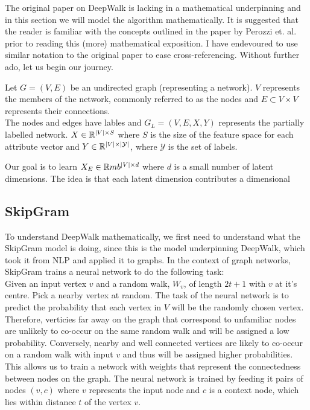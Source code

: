 \documentclass[a4paper]{article}
\begin{document}
The original paper on DeepWalk is lacking in a mathematical underpinning and in
this section we will model the algorithm mathematically. It is suggested that the reader
is familiar with the concepts outlined in the paper by Perozzi et. al. prior to
reading this (more) mathematical exposition. I have endevoured to use similar
notation to the original paper to ease cross-referencing. Without further ado, let us begin
our journey.

\begin{definition}
  Let $G = (V, E)$ be an undirected graph (representing a network). $V$ represents the
  members of the network, commonly referred to as the nodes and $E \subset V
  \times V$ represents their connections.\\

  The nodes and edges have lables and $G_L = (V, E, X, Y)$ represents the
  partially labelled network. $X \in \R^{|V| \times S}$ where $S$ is the size of
  the feature space for each attribute vector and $Y \in \R^{|V| \times
    |\mathcal{Y}|}$, where $\mathcal{Y}$ is the set of labels.
\end{definition}

Our goal is to learn $X_E \in \R mb^{|V| \times d}$ where $d$ is a small number
of latent dimensions. The idea is that each latent dimension contributes a 
dimensional

\subsection{SkipGram}
To understand DeepWalk mathematically, we first need to understand what the SkipGram
model is doing, since this is the model underpinning DeepWalk, which took it
from NLP and applied it to graphs. In the context of graph networks, SkipGram trains a neural network to do the
following task:\\
Given an input vertex $v$ and a random walk, $W_{v}$, of length $2t+1$ with $v$
at it's centre. Pick a nearby vertex at random. The task of the neural network is to
predict the probability that each vertex in $V$ will be the randomly chosen
vertex. Therefore, verticies far away on the graph that correspond to unfamiliar
nodes are unlikely to co-occur on the same random walk and will be assigned a
low probability. Conversely, nearby and well connected vertices are likely to
co-occur on a random walk with input $v$ and thus will be assigned higher
probabilities. This allows us to train a network with weights that represent the
connectedness between nodes on the graph. The neural network is trained by
feeding it pairs of nodes $(v, c)$ where $v$ represents the input node and $c$ is a context node, which lies within distance
$t$ of the vertex $v$.\\ 
\end{document}
